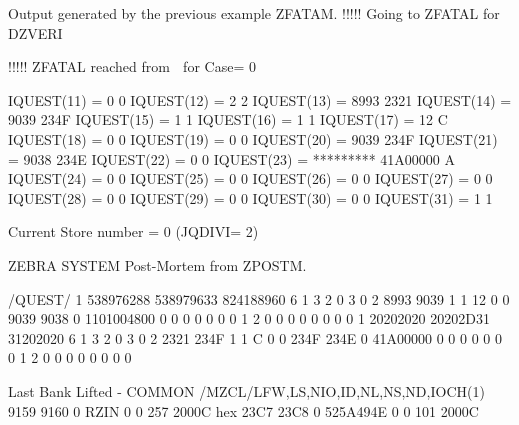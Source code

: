 \begin{landscapebody}
\begin{XMPt}{Output generated by the previous example}
ZFATAM.  !!!!!  Going to ZFATAL for DZVERI

!!!!! ZFATAL reached from   for Case=  0

         IQUEST(11) =         0                0
         IQUEST(12) =         2                2
         IQUEST(13) =      8993             2321
         IQUEST(14) =      9039             234F
         IQUEST(15) =         1                1
         IQUEST(16) =         1                1
         IQUEST(17) =        12                C
         IQUEST(18) =         0                0
         IQUEST(19) =         0                0
         IQUEST(20) =      9039             234F
         IQUEST(21) =      9038             234E
         IQUEST(22) =         0                0
         IQUEST(23) = *********         41A00000   A 
         IQUEST(24) =         0                0
         IQUEST(25) =         0                0
         IQUEST(26) =         0                0
         IQUEST(27) =         0                0
         IQUEST(28) =         0                0
         IQUEST(29) =         0                0
         IQUEST(30) =         0                0
         IQUEST(31) =         1                1

         Current Store number =  0  (JQDIVI= 2)

ZEBRA SYSTEM Post-Mortem from ZPOSTM.

/QUEST/
             1    538976288    538979633    824188960            6            1            3            2
             0            3            0            2         8993         9039            1            1
            12            0            0         9039         9038            0   1101004800            0
             0            0            0            0            0            0            1            2
             0            0            0            0            0            0            0            0
             1     20202020     20202D31     31202020            6            1            3            2
             0            3            0            2         2321         234F            1            1
             C            0            0         234F         234E            0     41A00000            0
             0            0            0            0            0            0            1            2
             0            0            0            0            0            0            0            0

Last Bank Lifted - COMMON /MZCL/LFW,LS,NIO,ID,NL,NS,ND,IOCH(1)
       9159      9160   0  RZIN       0       0     257        2000C hex
          23C7         23C8            0     525A494E            0            0          101        2000C


\end{XMPt}
\end{landscapebody}
